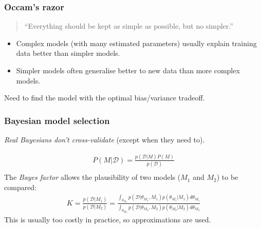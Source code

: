 
\begin{frame}
\frametitle{Occam's razor}
\begin{quote}
``Everything should be kept as simple as possible, but no simpler.''
\par {}
\end{quote}
\vspace{0.25cm}
\begin{itemize}
\item Complex models (with many estimated parameters) usually explain training data better than simpler models.\par
\item Simpler models often generalise better to new data than more complex models.\par
\end{itemize}
Need to find the model with the optimal bias/variance tradeoff.\par
\end{frame}

\begin{frame}
\frametitle{Bayesian model selection}
\emph{Real Bayesians don't cross-validate} (except when they need to).\par
\begin{align*}
P(M|\mathcal{D}) = \frac{p(\mathcal{D}|M) P(M)}{p(\mathcal{D})}\\
\end{align*}
The \emph{Bayes factor} allows the plausibility of two models ($M_1$ and $M_2$) to be compared:
\begin{align*}
K = \frac{p(\mathcal{D}|M_1)}{p(\mathcal{D}|M_2)} =
    \frac{\int_{\theta_{M_1}} p(\mathcal{D}|\theta_{M_1},M_1) p(\theta_{M_1}|M_1) d{\theta}_{M_1}}
         {\int_{\theta_{M_2}} p(\mathcal{D}|\theta_{M_2},M_2) p(\theta_{M_2}|M_2) d{\theta}_{M_2}}
\end{align*}
This is usually too costly in practice, so approximations are used.
\end{frame}


